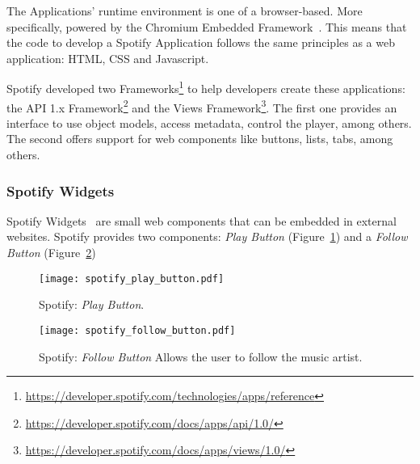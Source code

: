         The Applications' runtime environment is one of a browser-based.
        More specifically, powered by the Chromium Embedded Framework~\cite{chromiumembedded}.
        This means that the code to develop a Spotify Application follows the same principles as a web application: HTML, CSS and Javascript.

        Spotify developed two Frameworks\footnote{\url{https://developer.spotify.com/technologies/apps/reference}} to help developers create these applications: the API 1.x Framework\footnote{\url{https://developer.spotify.com/docs/apps/api/1.0/}} and the Views Framework\footnote{\url{https://developer.spotify.com/docs/apps/views/1.0/}}.
        The first one provides an interface to use object models, access metadata, control the player, among others.
        The second offers support for web components like buttons, lists, tabs, among others.



      \subsubsection{Spotify Widgets} %
      \label{ssub:spotify_widgets}

        Spotify Widgets~\cite{spwidgets} are small web components that can be embedded in external websites.
        Spotify provides two components: \emph{Play Button} (Figure~\ref{fig:spotify_play_button}) and a \emph{Follow Button} (Figure~\ref{fig:spotify_follow_button})

        \begin{figure}[H]
          \begin{center}
            \texttt{[image: spotify\_play\_button.pdf]}
          \end{center}
          \caption{Spotify: \emph{Play Button}.}
          \label{fig:spotify_play_button}
        \end{figure}

        \begin{figure}[H]
          \begin{center}
            \texttt{[image: spotify\_follow\_button.pdf]}
          \end{center}
          \caption{Spotify: \emph{Follow Button} Allows the user to follow the music artist.}
          \label{fig:spotify_follow_button}
        \end{figure}

